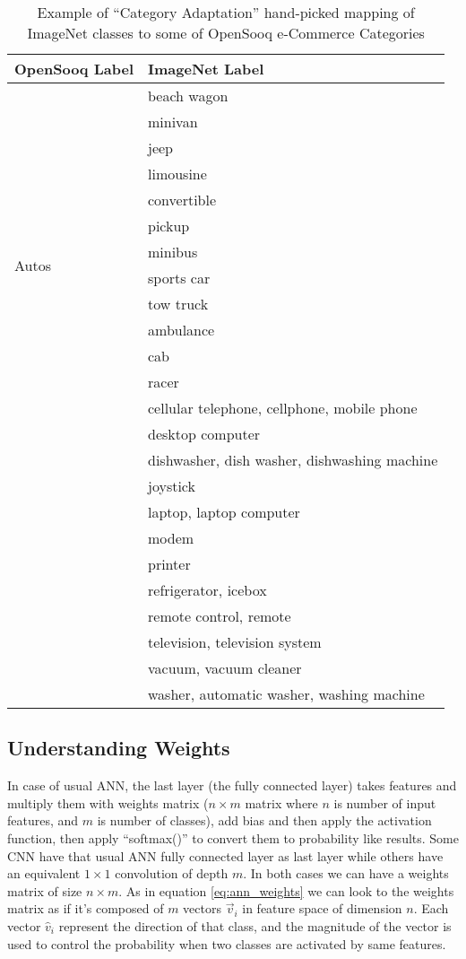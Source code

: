 \begin{table*}\caption{Example of ``Category Adaptation'' hand-picked mapping of ImageNet classes to some of OpenSooq e-Commerce Categories}\label{table:mapping_os_imagenet}
\begin{tabularx}{\textwidth}{lX}
\toprule
OpenSooq Label & ImageNet Label \\
\midrule
\multirow{14}{*}{Autos} & beach wagon \\
 & minivan \\
 & jeep \\
 & limousine \\
 & convertible \\
 & pickup \\
 & minibus \\
 & sports car \\
 & tow truck \\
 & ambulance \\
 & cab \\
 & racer \\
\midrule
\multirow{12}{*}{Electronics} & cellular telephone, cellphone, mobile phone \\
 & desktop computer \\
 & dishwasher, dish washer, dishwashing machine \\
 & joystick \\
 & laptop, laptop computer \\
 & modem \\
 & printer \\
 & refrigerator, icebox \\
 & remote control, remote \\
 & television, television system \\
 & vacuum, vacuum cleaner \\
 & washer, automatic washer, washing machine \\
\bottomrule
\end{tabularx}
\end{table*}

\subsection{Understanding Weights}

In case of usual ANN, the last layer (the fully connected layer) takes features and multiply them with weights matrix
(\(n\times m\) matrix where \(n\) is number of input features, and \(m\) is number of classes),
add bias and then apply the activation function, then apply ``softmax()'' to convert them to probability like results.
Some CNN have that usual ANN fully connected layer as last layer while others have an equivalent \(1\times1\) convolution
of depth \(m\). In both cases we can have a weights matrix of size \(n\times m\).
As in equation \ref{eq:ann_weights} we can look
to the weights matrix as if it's composed of \(m\) vectors \(\vec{v}_i\) in feature space of dimension \(n\).
Each vector \(\hat{v}_i\) represent the direction of that class, and
the magnitude of the vector is used to control the probability when two classes are activated by same features.

